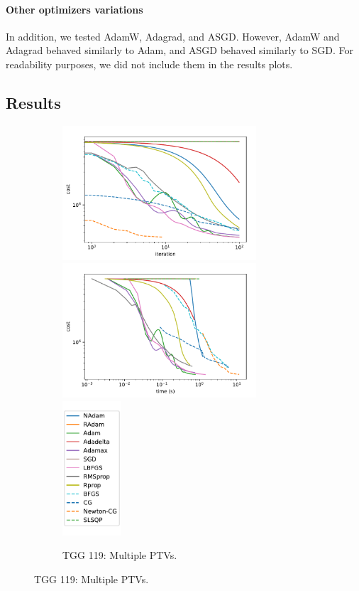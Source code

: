 \paragraph{Other optimizers variations}
In addition, we tested AdamW, Adagrad, and ASGD.
However, AdamW and Adagrad behaved similarly to Adam, and ASGD behaved similarly to SGD.
For readability purposes, we did not include them in the results plots.

\subsection{Results}

\begin{figure}
	\centering
	\begin{subfigure}{\textwidth}
		\centering
		\includegraphics[height=5cm]{optimizers_comparison/TGG119Multi-iter.pdf}
		\includegraphics[height=5cm]{optimizers_comparison/TGG119Multi-time.pdf}
		\includegraphics[height=5cm]{optimizers_comparison/legend.pdf}
		\caption{TGG 119: Multiple PTVs.}
		\label{fig:TGG119_Multi}

\end{subfigure}
\end{figure}
